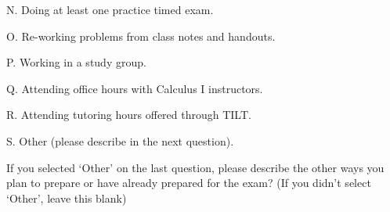 \documentclass{ximera}
\begin{document}
\begin{question}
\begin{question}
    N. Doing at least one practice timed exam.
    \begin{multipleChoice}
    \end{multipleChoice}
\end{question}

\begin{question}
    O. Re-working problems from class notes and handouts.
    \begin{multipleChoice}
    \end{multipleChoice}
\end{question}

\begin{question}
    P. Working in a study group.
    \begin{multipleChoice}
    \end{multipleChoice}
\end{question}

\begin{question}
    Q. Attending office hours with Calculus I instructors.
    \begin{multipleChoice}
    \end{multipleChoice}
\end{question}

\begin{question}
    R. Attending tutoring hours offered through TILT.
    \begin{multipleChoice}
    \end{multipleChoice}
\end{question}

\begin{question}
    S. Other (please describe in the next question).
    \begin{multipleChoice}
    \end{multipleChoice}
\end{question}
\end{question}

\begin{question}
    If you selected `Other' on the last question, please describe the other ways you plan to prepare or have already prepared for the exam? (If you didn't select `Other', leave this blank)\\

    \begin{freeResponse}
    \end{freeResponse}
\end{question}
\end{document}
